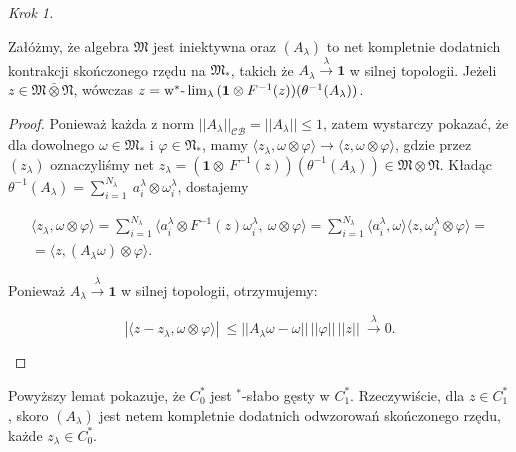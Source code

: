 {\it Krok 1.}
\begin{Lemma}
\label{lem:netinvNalg}
Załóżmy, że algebra $\mathfrak{M}$ jest iniektywna oraz
$(A_{\lambda})$ to net kompletnie dodatnich kontrakcji skończonego rzędu na
$\mathfrak{M}_{*}$, takich że
$A_{\lambda} \stackrel{\lambda}{\rightarrow} \mathbf{1}$ w silnej topologii.
Jeżeli $z \in \mathfrak{M} \bar{\otimes} \mathfrak{N}$, wówczas
$z = {\rm w}^*\mbox{-}\lim_{\lambda} \, (\mathbf{1} \otimes F^{-1}(z) )
(\theta^{-1} (A_{\lambda}))$.
\end{Lemma}
\begin{proof}
Ponieważ każda z norm $||A_{\lambda}||_{\mathcal{CB}} = || A_{\lambda} ||  \leq 1$,
zatem wystarczy pokazać, że dla dowolnego $\omega \in \mathfrak{M}_{*}$
i $\varphi \in \mathfrak{N}_{*}$,
mamy
$\langle z_{\lambda}, \omega \otimes \varphi\rangle{\longrightarrow}
\langle z , \omega \otimes \varphi\rangle$,
gdzie przez $(z_{\lambda})$ oznaczyliśmy net $z_{\lambda} = (\mathbf{1} \otimes \
F^{-1}(z))(\theta^{-1}(A_{\lambda})) \in \mathfrak{M} \otimes \mathfrak{N}$.
Kładąc
$\theta^{-1}(A_{\lambda}) = \sum_{i=1}^{N_{\lambda}} \
a_{i}^{\lambda} \otimes \omega_{i}^{\lambda}$, dostajemy
\begin{linenomath*}
 \begin{multline}
\langle z_{\lambda}, \omega \otimes \varphi\rangle =
\sum \limits_{i=1}^{N_{\lambda}}
\langle a_{i}^{\lambda} \otimes F^{-1}(z) \omega_{i}^{\lambda} ,\
\omega \otimes \varphi \rangle
= \sum \limits_{i=1}^{N_{\lambda}}
\langle  a_{i}^{\lambda}, \omega \rangle
\langle z,  \omega_{i}^{\lambda} \otimes \varphi \rangle = \\
= \langle z , (A_{\lambda} \omega) \otimes \varphi \rangle.
 \end{multline}
\end{linenomath*}
Ponieważ $A_{\lambda} \stackrel{\lambda}{\rightarrow} \mathbf{1}$ w silnej topologii,
otrzymujemy:
\begin{linenomath*}
 \begin{equation}
| \langle z - z_{\lambda}, \omega\otimes \varphi \rangle | \
\leq || A_{\lambda} \omega - \omega || \, ||\varphi|| \, ||z|| \
\stackrel{\lambda}{\longrightarrow} 0.
 \end{equation}
\end{linenomath*}
\end{proof}

\begin{Corollary}
\label{cor:denseness}
Powyższy lemat pokazuje, że $C_0^*$ jest $^{*}$-słabo gęsty w $C_1^*$.
Rzeczywiście, dla
$z \in C_{1}^{*}$, skoro $(A_{\lambda})$ jest netem kompletnie dodatnich
odwzorowań skończonego rzędu, każde $z_{\lambda} \in C_{0}^{*}$.
\end{Corollary}

